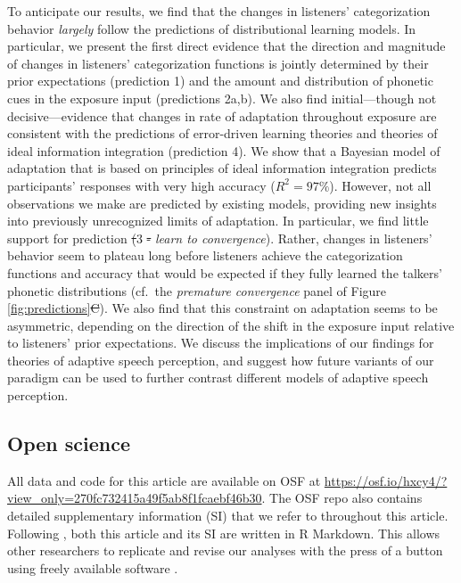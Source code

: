 \documentclass[
  11pt,
  man,mask,floatsintext]{apa6}
\makeatletter
\providecommand{\DIFadd}[1]{{\protect\color{blue}\uwave{#1}}} %
\providecommand{\DIFdel}[1]{{\protect\color{red}\sout{#1}}} %
\providecommand{\DIFaddbegin}{} %
\providecommand{\DIFaddend}{} %
\providecommand{\DIFdelbegin}{} %
\providecommand{\DIFdelend}{} %
\newcommand{\DIFscaledelfig}{0.5}
\newlength{\DIFdelgraphicswidth} %
\newlength{\DIFdelgraphicsheight} %
\newcommand{\DIFaddincludegraphics}[2][]{{\color{blue}\fbox{\DIFOincludegraphics[#1]{#2}}}} %
\newcommand{\DIFdelincludegraphics}[2][]{%
\sbox{\DIFdelgraphicsbox}{\DIFOincludegraphics[#1]{#2}}%
\settoboxwidth{\DIFdelgraphicswidth}{\DIFdelgraphicsbox} %
\settoboxtotalheight{\DIFdelgraphicsheight}{\DIFdelgraphicsbox} %
\scalebox{\DIFscaledelfig}{%
\parbox[b]{\DIFdelgraphicswidth}{\usebox{\DIFdelgraphicsbox}\\[-\baselineskip] \rule{\DIFdelgraphicswidth}{0em}}\llap{\resizebox{\DIFdelgraphicswidth}{\DIFdelgraphicsheight}{%
\setlength{\unitlength}{\DIFdelgraphicswidth}%
\begin{picture}(1,1)%
\thicklines\linethickness{2pt} %
{\color[rgb]{1,0,0}\put(0,0){\framebox(1,1){}}}%
{\color[rgb]{1,0,0}\put(0,0){\line( 1,1){1}}}%
{\color[rgb]{1,0,0}\put(0,1){\line(1,-1){1}}}%
\end{picture}%
}\hspace*{3pt}}} %
} %
\DeclareRobustCommand{\DIFaddbegin}{\DIFOaddbegin \let\includegraphics\DIFaddincludegraphics} %
\DeclareRobustCommand{\DIFaddend}{\DIFOaddend \let\includegraphics\DIFOincludegraphics} %
\DeclareRobustCommand{\DIFdelbegin}{\DIFOdelbegin \let\includegraphics\DIFdelincludegraphics} %
\DeclareRobustCommand{\DIFdelend}{\DIFOaddend \let\includegraphics\DIFOincludegraphics} %
\let\sout@orig\sout %
\renewcommand{\sout}[1]{\ifmmode\text{\sout@orig{\ensuremath{#1}}}\else\sout@orig{#1}\fi} %
\makeatother
\begin{document}
To anticipate our results, we find that the changes in listeners' categorization behavior \emph{largely} follow the predictions of distributional learning models. In particular, we present the first direct evidence that the direction and magnitude of changes in listeners' categorization functions is jointly determined by their prior expectations (prediction 1) and the amount and distribution of phonetic cues in the exposure input (predictions 2a,b). We also find initial---though not decisive---evidence that changes in rate of adaptation throughout exposure are consistent with the predictions of error-driven learning theories and theories of ideal information integration (prediction 4). We show that a Bayesian model of adaptation that is based on principles of ideal information integration \autocites[the ideal adaptor,][]{kleinschmidt-jaeger2015,kleinschmidt-jaeger2016} predicts participants' responses with very high accuracy (\(R^2 = 97\%\)). However, not all observations we make are predicted by existing models, providing new insights into previously unrecognized limits of adaptation. In particular, we find little support for prediction \DIFdelbegin \DIFdel{(}\DIFdelend 3 \DIFdelbegin \DIFdel{- }\DIFdelend \DIFaddbegin \DIFadd{(}\DIFaddend \emph{learn to convergence}). Rather, changes in listeners' behavior seem to plateau long before listeners achieve the categorization functions and accuracy that would be expected if they fully learned the talkers' phonetic distributions (cf.~the \emph{premature convergence} panel of Figure \ref{fig:predictions}\DIFdelbegin \DIFdel{C}\DIFdelend \DIFaddbegin \DIFadd{D}\DIFaddend ). We also find that this constraint on adaptation seems to be asymmetric, depending on the direction of the shift in the exposure input relative to listeners' prior expectations. We discuss the implications of our findings for theories of adaptive speech perception, and suggest how future variants of our paradigm can be used to further contrast different models of adaptive speech perception.

\subsection{Open science}\label{open-science}

All data and code for this article are available on OSF at \url{https://osf.io/hxcy4/?view_only=270fc732415a49f5ab8f1fcaebf46b30}. The OSF repo also contains detailed supplementary information (SI) that we refer to throughout this article. Following \textcite{xie2023}, both this article and its SI are written in R Markdown. This allows other researchers to replicate and revise our analyses with the press of a button using freely available software \autocites[R,][]{R-base}[see also SI, \ref{sec:software}]{RStudio}.
\end{document}

